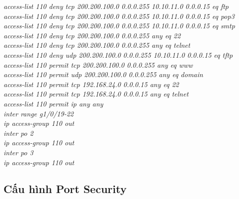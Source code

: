 \documentclass[a4paper, 12pt]{article}
\begin{document}
\hspace*{2cm}\textit{access-list 110 deny tcp 200.200.100.0 0.0.0.255 10.10.11.0 0.0.0.15 eq ftp\\
\hspace*{2cm}access-list 110 deny tcp 200.200.100.0 0.0.0.255 10.10.11.0 0.0.0.15 eq pop3\\
\hspace*{2cm}access-list 110 deny tcp 200.200.100.0 0.0.0.255 10.10.11.0 0.0.0.15 eq smtp\\
\hspace*{2cm}access-list 110 deny tcp 200.200.100.0 0.0.0.255 any eq 22\\
\hspace*{2cm}access-list 110 deny tcp 200.200.100.0 0.0.0.255 any eq telnet\\
\hspace*{2cm}access-list 110 deny udp 200.200.100.0 0.0.0.255 10.10.11.0 0.0.0.15 eq tftp\\
\hspace*{2cm}access-list 110 permit tcp 200.200.100.0 0.0.0.255 any eq www\\
\hspace*{2cm}access-list 110 permit udp 200.200.100.0 0.0.0.255 any eq domain\\
\hspace*{2cm}access-list 110 permit tcp 192.168.24.0 0.0.0.15 any eq 22\\
\hspace*{2cm}access-list 110 permit tcp 192.168.24.0 0.0.0.15 any eq telnet\\
\hspace*{2cm}access-list 110 permit ip any any\\
\hspace*{2cm}inter range g1/0/19-22\\
\hspace*{2cm}ip access-group 110 out\\
\hspace*{2cm}inter po 2\\
\hspace*{2cm}ip access-group 110 out\\
\hspace*{2cm}inter po 3\\
\hspace*{2cm}ip access-group 110 out\\
}
\subsection{Cấu hình Port Security}
\end{document}
